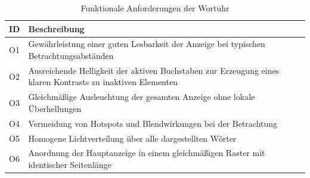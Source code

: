 \begin{table}[H]
\centering
\begin{tabular}{p{3cm} p{9cm}}
\textbf{ID} & \textbf{Beschreibung} \\
\hline
O1 & Gewährleistung einer guten Lesbarkeit der Anzeige bei typischen Betrachtungsabständen \\
O2 & Ausreichende Helligkeit der aktiven Buchstaben zur Erzeugung eines klaren Kontrasts zu inaktiven Elementen \\
O3 & Gleichmäßige Ausleuchtung der gesamten Anzeige ohne lokale Überhellungen \\
O4 & Vermeidung von Hotspots und Blendwirkungen bei der Betrachtung \\
O5 & Homogene Lichtverteilung über alle dargestellten Wörter \\
O6 & Anordnung der Hauptanzeige in einem gleichmäßigen Raster mit identischer Seitenlänge \\
\end{tabular}
\caption{Funktionale Anforderungen der Wortuhr}
\label{tab:Optische Anforderung}
\end{table}

